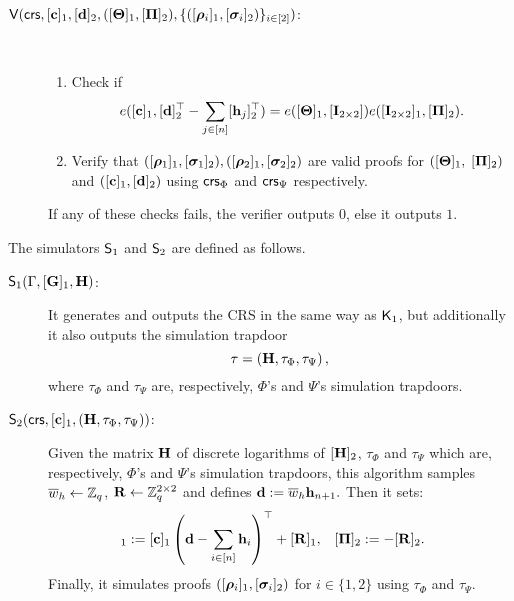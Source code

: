 \begin{description}
\item[{$\mathsf{V}(
    \mathsf{crs},
    [\mathbf{c}]_1,
    [\mathbf{d}]_2,
        ([\mathbf{{\Theta}}]_1, [\mathbf{{\Pi}}]_2), 
        \{([{\boldsymbol \rho}_{i}]_1, [{\boldsymbol \sigma}_{i}]_2)\}_{i \in [2]} )$}:] ~
%   
\begin{enumerate}
\item Check if 
\begin{equation}\label{eq:ver1}
e([\mathbf{c}]_1,[\mathbf{d}]_2^\top-
    \sum_{j \in [n]} [\mathbf{h}_j]_2^\top) =
    e([\mathbf{{\Theta}}]_1,[\mathbf{{I}}_{2 \times 2}]) e([\mathbf{{I}}_{2 \times 2}]_1,[\mathbf{{\Pi}}]_2).
    \end{equation}  
  \item Verify that $([{\boldsymbol \rho}_1]_1, [{\boldsymbol \sigma}_1]_2),([{\boldsymbol \rho}_{2}]_1,[{\boldsymbol \sigma}_2]_2)$ are valid proofs for %
  $([\mathbf{{\Theta}}]_1,$ $[\mathbf{{\Pi}}]_2)$
        and $([\mathbf{c}]_1,[\mathbf{d}]_2)$ using $\mathsf{crs}_\Phi$ and $\mathsf{crs}_\Psi$ respectively.
\end{enumerate}
If any of these checks fails, the verifier outputs $0$, else it outputs $1$. \\
\end{description}

The simulators $\mathsf{S}_1$ and $\mathsf{S}_2$ are defined as follows.
\begin{description}
\item[{$\mathsf{S}_1(\Gamma,[\mathbf{{G}}]_1,\mathbf{{H}})$}:] It generates and outputs the CRS in the same way as $\mathsf{K}_1$, but additionally it also  outputs the simulation trapdoor 
$$\tau=\left(\mathbf{{H}},\tau_\Phi, \tau_\Psi\right),$$
where $\tau_\Phi$ and $\tau_\Psi$ are, respectively, $\Phi$'s and $\Psi$'s simulation trapdoors.
\item[{$\mathsf{S}_2(\mathsf{crs},[\mathbf{c}]_1,\left(\mathbf{{H}},\tau_\Phi, \tau_\Psi\right))$}:]  Given the matrix $\mathbf{{H}}$ of discrete logarithms of $[\mathbf{{H}}]_2$, $\tau_\Phi$ and $\tau_\Psi$ which are, respectively, $\Phi$'s and $\Psi$'s simulation trapdoors, this algorithm samples 
$\overline{w}_h \gets \mathbb{Z}_q$, $\mathbf{{R}} \gets \mathbb{Z}_q^{2 \times 2}$ and defines 
 $\mathbf{d}:= \overline{w}_{h} \mathbf{h}_{n+1}.$
 Then it sets:
\begin{align*} 
[\matr{\Theta}]_1 & :=  [\vecb{c}]_1\left(\vecb{d}-\sum_{i \in [n]} \lrck_i\right)^\top + [\matr{R}]_1,
    &
[\matr{\Pi}]_2 & := - [\matr{R}]_2.
\end{align*}
Finally, it simulates proofs $([{\boldsymbol \rho}_{i}]_1, [{\boldsymbol \sigma}_{i}]_2)$
for $i \in \{1,2\}$  using $\tau_\Phi$ and $\tau_\Psi$.
\end{description}

